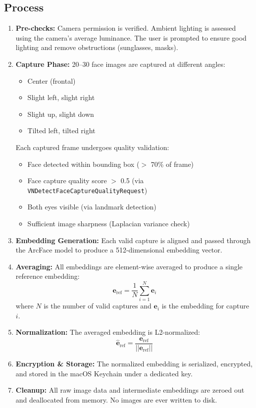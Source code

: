 \documentclass[12pt,a4paper]{report}
\begin{document}
\subsection{Process}
\begin{enumerate}
    \item \textbf{Pre-checks:} Camera permission is verified. Ambient lighting is assessed using the camera's average luminance. The user is prompted to ensure good lighting and remove obstructions (sunglasses, masks).
    
    \item \textbf{Capture Phase:} 20--30 face images are captured at different angles:
    \begin{itemize}[noitemsep]
        \item Center (frontal)
        \item Slight left, slight right
        \item Slight up, slight down
        \item Tilted left, tilted right
    \end{itemize}
    Each captured frame undergoes quality validation:
    \begin{itemize}[noitemsep]
        \item Face detected within bounding box ($>$ 70\% of frame)
        \item Face capture quality score $>$ 0.5 (via \texttt{VNDetectFaceCaptureQualityRequest})
        \item Both eyes visible (via landmark detection)
        \item Sufficient image sharpness (Laplacian variance check)
    \end{itemize}
    
    \item \textbf{Embedding Generation:} Each valid capture is aligned and passed through the ArcFace model to produce a 512-dimensional embedding vector.
    
    \item \textbf{Averaging:} All embeddings are element-wise averaged to produce a single reference embedding:
    \[
    \mathbf{e}_{\text{ref}} = \frac{1}{N} \sum_{i=1}^{N} \mathbf{e}_i
    \]
    where $N$ is the number of valid captures and $\mathbf{e}_i$ is the embedding for capture $i$.
    
    \item \textbf{Normalization:} The averaged embedding is L2-normalized:
    \[
    \hat{\mathbf{e}}_{\text{ref}} = \frac{\mathbf{e}_{\text{ref}}}{||\mathbf{e}_{\text{ref}}||}
    \]
    
    \item \textbf{Encryption \& Storage:} The normalized embedding is serialized, encrypted, and stored in the macOS Keychain under a dedicated key.
    
    \item \textbf{Cleanup:} All raw image data and intermediate embeddings are zeroed out and deallocated from memory. No images are ever written to disk.
\end{enumerate}
\end{document}
